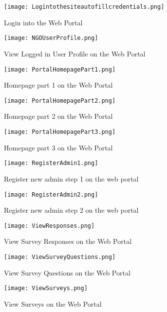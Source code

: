\begin{figure}[H]
    \centering
	\texttt{[image: Logintothesiteautofillcredentials.png]}
    \caption{Login into the Web Portal}
    \label{fig:Login into the Web Portal}
\end{figure}


\begin{figure}[H]
    \centering
	\texttt{[image: NGOUserProfile.png]}
    \caption{View Logged in User Profile on the Web Portal }
    \label{fig:View Logged in User Profile on the Web Portal}
\end{figure}

\begin{figure}[H]
    \centering
	\texttt{[image: PortalHomepagePart1.png]}
    \caption{Homepage part 1 on the Web Portal}
    \label{fig:Homepage part 1 on the Web Portal}
\end{figure}

\begin{figure}[H]
    \centering
	\texttt{[image: PortalHomepagePart2.png]}
    \caption{Homepage part 2 on the Web Portal}
    \label{fig:Homepage part 2 on the Web Portal}
\end{figure}

\begin{figure}[H]
    \centering
	\texttt{[image: PortalHomepagePart3.png]}
    \caption{Homepage part 3 on the Web Portal}
    \label{fig:Homepage part 3 on the Web Portal}
\end{figure}

\begin{figure}[H]
    \centering
	\texttt{[image: RegisterAdmin1.png]}
    \caption{Register new admin step 1 on the web portal}
    \label{fig:Register new admin step 1 on the web portal}
\end{figure}

\begin{figure}[H]
    \centering
	\texttt{[image: RegisterAdmin2.png]}
    \caption{Register new admin step 2 on the web portal}
    \label{fig:Register new admin step 2 on the web portal}
\end{figure}

\begin{figure}[H]
    \centering
	\texttt{[image: ViewResponses.png]}
    \caption{View Survey Responses on the Web Portal}
    \label{fig:View Survey Responses on the Web Portal}
\end{figure}

\begin{figure}[H]
    \centering
	\texttt{[image: ViewSurveyQuestions.png]}
    \caption{View Survey Questions on the Web Portal}
    \label{fig:View Survey Questions on the Web Portal}
\end{figure}


\begin{figure}[H]
    \centering
	\texttt{[image: ViewSurveys.png]}
    \caption{View Surveys on the Web Portal}
    \label{fig:View Surveys on the Web Portal}
\end{figure}

